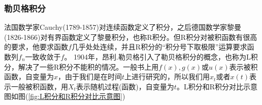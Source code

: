         \subsubsection{勒贝格积分}
            \label{subsubsec:勒贝格积分}
            \par
            法国数学家Cauchy(1789-1857)对连续函数定义了积分，之后德国数学家黎曼(1826-1866)对有界函数定义了黎曼积分，也称R积分。但R积分对被积函数有很高的要求，他要求函数$f$几乎处处连续，并且R积分的“积分号下取极限”运算要求函数列$f_n$一致收敛于$f$。
            1904年，昂利.勒贝格引入了勒贝格积分的概念，也称为L积分，解决了一些R积分不能积的情况。一般书上用$f(x),g(x)$或$u(x)$表示被积函数，自变量为$x$，由于我们是在时间$t$上进行研究的，所以我们用$x_t$或者$x(t)$表示一般被积函数，用$X_t$表示随机过程(函数)，自变量为$t$。L积分和R积分对比示意图如图(\ref{fig:L积分和R积分对比示意图})

